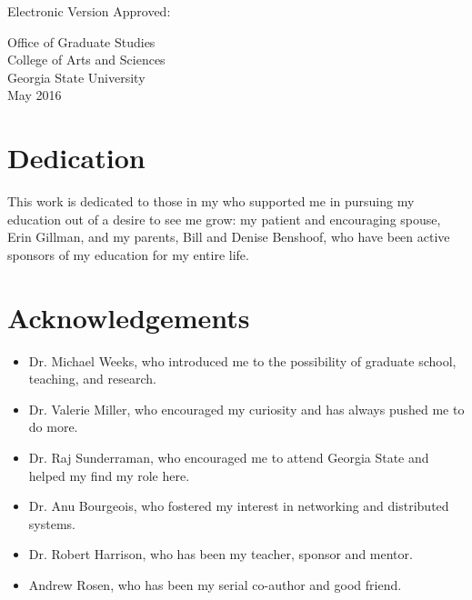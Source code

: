 \documentclass[12pt,letterpaper]{report}
\begin{document}
	
	\noindent
	Electronic Version Approved:\\
	\vspace{1cm}
	
	\noindent
	Office of Graduate Studies \\
	College of Arts and Sciences \\
	Georgia State University\\
	May 2016 
	
	
	
	
	\chapter*{Dedication}
	This work is dedicated to those in my who supported me in pursuing my education out of a desire to see me grow: my patient and encouraging spouse, Erin Gillman, and my parents, Bill and Denise Benshoof, who have been active sponsors of my education for my entire life.
	
	
	\chapter*{Acknowledgements}	

\begin{itemize}
\item	Dr. Michael Weeks, who introduced me to the possibility of graduate school, teaching, and research.
\item	Dr. Valerie Miller, who encouraged my curiosity and has always pushed me to do more. 
\item	Dr. Raj Sunderraman, who encouraged me to attend Georgia State and helped my find my role here.
\item	Dr. Anu Bourgeois, who fostered my interest in networking and distributed systems.
\item	Dr. Robert Harrison, who has been my teacher, sponsor and mentor.
\item   Andrew Rosen, who has been my serial co-author and good friend.
\end{itemize}
	

	
	\setcounter{tocdepth}{0}
	\tableofcontents
	\cleardoublepage


	\setcounter{tocdepth}{1}
	\listoftables
	\listoffigures
	
	

	\clearpage	
	
	
	
	
	
	
	
	
	
	
	
\end{document}
